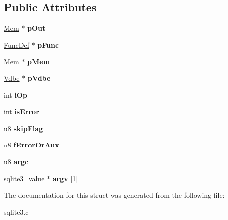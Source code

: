 \subsection*{Public Attributes}
\begin{DoxyCompactItemize}
\item 
\hyperlink{structMem}{Mem} $\ast$ {\bfseries p\+Out}\hypertarget{structsqlite3__context_ae22b1db2ea357b70dda4a86b6df01f34}{}\label{structsqlite3__context_ae22b1db2ea357b70dda4a86b6df01f34}

\item 
\hyperlink{structFuncDef}{Func\+Def} $\ast$ {\bfseries p\+Func}\hypertarget{structsqlite3__context_af4215c87be2c0cb10868f623a552a2aa}{}\label{structsqlite3__context_af4215c87be2c0cb10868f623a552a2aa}

\item 
\hyperlink{structMem}{Mem} $\ast$ {\bfseries p\+Mem}\hypertarget{structsqlite3__context_a7b84aa5920329cb0eb943832175b48b5}{}\label{structsqlite3__context_a7b84aa5920329cb0eb943832175b48b5}

\item 
\hyperlink{structVdbe}{Vdbe} $\ast$ {\bfseries p\+Vdbe}\hypertarget{structsqlite3__context_ab35b02abe9a81e0c8cbdaeb0aa1a5874}{}\label{structsqlite3__context_ab35b02abe9a81e0c8cbdaeb0aa1a5874}

\item 
int {\bfseries i\+Op}\hypertarget{structsqlite3__context_a6f5930106488b9ead6f8efefe9125b6c}{}\label{structsqlite3__context_a6f5930106488b9ead6f8efefe9125b6c}

\item 
int {\bfseries is\+Error}\hypertarget{structsqlite3__context_ae4351b8da8c6d2676074612c1b8d4af5}{}\label{structsqlite3__context_ae4351b8da8c6d2676074612c1b8d4af5}

\item 
u8 {\bfseries skip\+Flag}\hypertarget{structsqlite3__context_a29c404b8744ed5967960c576f3e59bd3}{}\label{structsqlite3__context_a29c404b8744ed5967960c576f3e59bd3}

\item 
u8 {\bfseries f\+Error\+Or\+Aux}\hypertarget{structsqlite3__context_a342986cd1a7c165151c53af83fe24b1d}{}\label{structsqlite3__context_a342986cd1a7c165151c53af83fe24b1d}

\item 
u8 {\bfseries argc}\hypertarget{structsqlite3__context_a3246bd9287c845864193f0519804aede}{}\label{structsqlite3__context_a3246bd9287c845864193f0519804aede}

\item 
\hyperlink{structMem}{sqlite3\+\_\+value} $\ast$ {\bfseries argv} \mbox{[}1\mbox{]}\hypertarget{structsqlite3__context_a416e22362626c80a9dd4c7909871d90c}{}\label{structsqlite3__context_a416e22362626c80a9dd4c7909871d90c}

\end{DoxyCompactItemize}


The documentation for this struct was generated from the following file\+:\begin{DoxyCompactItemize}
\item 
sqlite3.\+c\end{DoxyCompactItemize}
